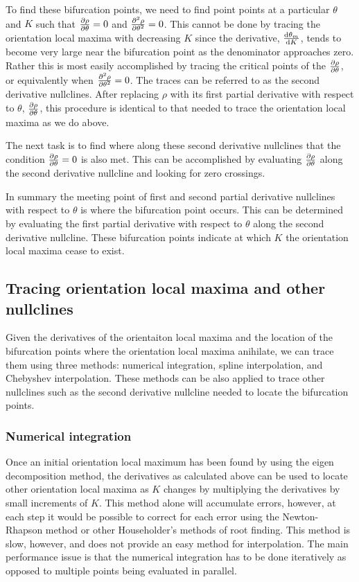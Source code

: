 \documentclass[11pt]{article} %
\begin{document}
To find these bifurcation points, we need to find point points at a particular $ \theta $ and $ K $ such that $ \pdv{\rho}{\theta} = 0 $ and $ \pdv[2]{\rho}{\theta} = 0 $. This cannot be done by tracing the orientation local maxima with decreasing $ K $ since the derivative, $ \dv{\theta_m}{K} $, tends to become very large near the bifurcation point as the denominator approaches zero. Rather this is most easily accomplished by tracing the critical points of the $ \pdv{\rho}{\theta} $, or equivalently when $ \pdv[2]{\rho}{\theta} = 0 $. The traces can be referred to as the second derivative nullclines. After replacing $ \rho $ with its first partial derivative with respect to $ \theta $, $ \pdv{\rho}{\theta} $, this procedure is identical to that needed to trace the orientation local maxima as we do above.

The next task is to find where along these second derivative nullclines that the condition $ \pdv{\rho}{\theta} = 0 $ is also met. This can be accomplished by evaluating $ \pdv{\rho}{\theta} $ along the second derivative nullcline and looking for zero crossings.

In summary the meeting point of first and second partial derivative nullclines with respect to $ \theta $ is where the bifurcation point occurs. This can be determined by evaluating the first partial derivative with respect to $ \theta $ along the second derivative nullcline. These bifurcation points indicate at which $ K $ the orientation local maxima cease to exist.

\subsection{Tracing orientation local maxima and other nullclines}

Given the derivatives of the orientaiton local maxima and the location of the bifurcation points where the orientation local maxima anihilate, we can trace them using three methods: numerical integration, spline interpolation, and Chebyshev interpolation. These methods can be also applied to trace other nullclines such as the second derivative nullcline needed to locate the bifurcation points.

\subsubsection{Numerical integration}

Once an initial orientation local maximum has been found by using the eigen decomposition method, the derivatives as calculated above can be used to locate other orientation local maxima as $ K $ changes by multiplying the derivatives by small increments of $ K $. This method alone will accumulate errors, however, at each step it would be possible to correct for each error using the Newton-Rhapson method or other Householder's methods of root finding. This method is slow, however, and does not provide an easy method for interpolation. The main performance issue is that the numerical integration has to be done iteratively as opposed to multiple points being evaluated in parallel.
\end{document}
